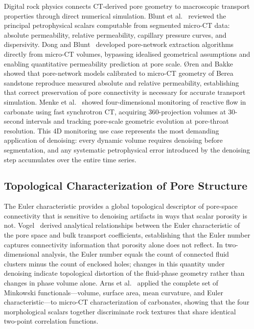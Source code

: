 \documentclass[review,12pt]{elsarticle}
\begin{document}
Digital rock physics connects CT-derived pore geometry to macroscopic
transport properties through direct numerical simulation.
Blunt et al.~\cite{Blunt2013} reviewed the principal petrophysical
scalars computable from segmented micro-CT data: absolute permeability,
relative permeability, capillary pressure curves, and dispersivity.
Dong and Blunt~\cite{Dong2009} developed pore-network extraction
algorithms directly from micro-CT volumes, bypassing idealised
geometrical assumptions and enabling quantitative permeability
prediction at pore scale.
\O{}ren and Bakke~\cite{Oren2003} showed that pore-network models
calibrated to micro-CT geometry of Berea sandstone reproduce measured
absolute and relative permeability, establishing that correct
preservation of pore connectivity is necessary for accurate transport
simulation.  Menke et al.~\cite{Menke2018} showed four-dimensional
monitoring of reactive flow in carbonate using fast synchrotron CT,
acquiring 360-projection volumes at 30-second intervals and tracking
pore-scale geometric evolution at pore-throat resolution.  This 4D
monitoring use case represents the most demanding application of
denoising: every dynamic volume requires denoising before segmentation,
and any systematic petrophysical error introduced by the denoising step
accumulates over the entire time series.

\subsection{Topological Characterization of Pore Structure}
\label{sec:related:topology}

The Euler characteristic provides a global topological descriptor of
pore-space connectivity that is sensitive to denoising artifacts in ways
that scalar porosity is not.  Vogel~\cite{Vogel2002} derived analytical
relationships between the Euler characteristic of the pore space and
bulk transport coefficients, establishing that the Euler number captures
connectivity information that porosity alone does not reflect.  In
two-dimensional analysis, the Euler number equals the count of connected
fluid clusters minus the count of enclosed holes; changes in this
quantity under denoising indicate topological distortion of the
fluid-phase geometry rather than changes in phase volume alone.  Arns
et al.~\cite{Arns2003} applied the complete set of Minkowski
functionals---volume, surface area, mean curvature, and Euler
characteristic---to micro-CT characterization of carbonates, showing
that the four morphological scalars together discriminate rock textures
that share identical two-point correlation functions.
\end{document}
